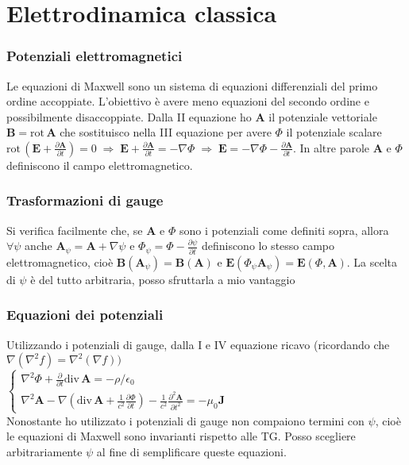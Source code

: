 \documentclass[11pt,a4paper]{article}
\newcommand{\fracp}[2]{\frac{\partial #1}{\partial #2}}
\newcommand{\fracpq}[2]{\frac{\partial^2\! #1}{{\partial #2}^2}}
\newcommand{\dive}[1]{\text{div}\,#1}
\newcommand{\rot}[1]{\text{rot}\,#1}
\begin{document}
	\section{Elettrodinamica classica}
\subsubsection{Potenziali elettromagnetici}
Le equazioni di Maxwell sono un sistema di equazioni differenziali del primo ordine accoppiate. L'obiettivo è avere meno equazioni del secondo ordine e possibilmente disaccoppiate. Dalla II equazione ho $\mathbf A$ il potenziale vettoriale $\mathbf B = \rot\mathbf A$ che sostituisco nella III equazione per avere $\Phi$ il potenziale scalare $\rot(\mathbf E + \fracp{\mathbf A}t) = 0 \;\Rightarrow\; \mathbf E + \fracp{\mathbf A}{t} = -\nabla\Phi \;\Rightarrow\; \mathbf E = -\nabla\Phi - \fracp{\mathbf A}t$. In altre parole $\mathbf A$ e $\Phi$ definiscono il campo elettromagnetico.

\subsubsection{Trasformazioni di gauge}
Si verifica facilmente che, se $\mathbf A$ e $\Phi$ sono i potenziali come definiti sopra, allora $\forall \psi$ anche $\mathbf A_\psi = \mathbf A + \nabla\psi$ e $\Phi_\psi= \Phi - \fracp{\psi}t$ definiscono lo stesso campo elettromagnetico, cioè $\mathbf B(\mathbf A_\psi) = \mathbf B(\mathbf A)$ e $\mathbf E(\Phi_\psi\mathbf A_\psi) = \mathbf E(\Phi,\mathbf A)$. La scelta di $\psi$ è del tutto arbitraria, posso sfruttarla a mio vantaggio

\subsubsection{Equazioni dei potenziali}
Utilizzando i potenziali di gauge, dalla I e IV equazione ricavo (ricordando che $\nabla(\nabla^2 f)=\nabla^2(\nabla f))$\\ 
$\begin{cases}
	\nabla^2 \Phi + \fracp{}{t}\dive\mathbf A = -\rho/\epsilon_0\\
	\nabla^2\mathbf A - \nabla(\dive\mathbf A + \frac1{c^2} \fracp{\Phi}t) - \frac1{c^2} \fracpq{\mathbf A}t = -\mu_0 \mathbf J
\end{cases}$\\
Nonostante ho utilizzato i potenziali di gauge non compaiono termini con $\psi$, cioè le equazioni di Maxwell sono invarianti rispetto alle TG. Posso scegliere arbitrariamente $\psi$ al fine di semplificare queste equazioni.
\end{document}
